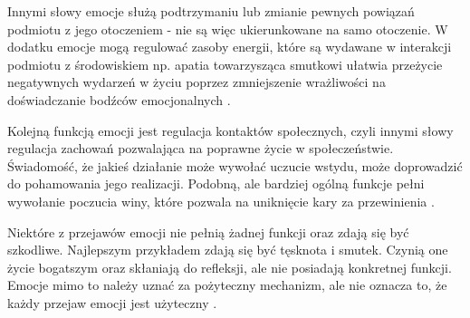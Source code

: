 Innymi słowy emocje służą podtrzymaniu lub zmianie pewnych powiązań podmiotu z jego otoczeniem - nie są więc ukierunkowane na samo otoczenie. W dodatku emocje mogą regulować zasoby energii, które są wydawane w interakcji podmiotu z środowiskiem np. apatia towarzysząca smutkowi ułatwia przeżycie negatywnych wydarzeń w życiu poprzez zmniejszenie wrażliwości na doświadczanie bodźców emocjonalnych \citep{ekman}.

Kolejną funkcją emocji jest regulacja kontaktów społecznych, czyli innymi słowy regulacja zachowań pozwalająca na poprawne życie w społeczeństwie. Świadomość, że jakieś działanie może wywołać uczucie wstydu, może doprowadzić do pohamowania jego realizacji. Podobną, ale bardziej ogólną funkcje pełni wywołanie poczucia winy, które pozwala na uniknięcie kary za przewinienia \citep{ekman}.

Niektóre z przejawów emocji nie pełnią żadnej funkcji oraz zdają się być szkodliwe. Najlepszym przykładem zdają się być tęsknota i smutek. Czynią one życie bogatszym oraz skłaniają do refleksji, ale nie posiadają konkretnej funkcji. Emocje mimo to należy uznać za pożyteczny mechanizm, ale nie oznacza to, że każdy przejaw emocji jest użyteczny \citep{ekman}.
